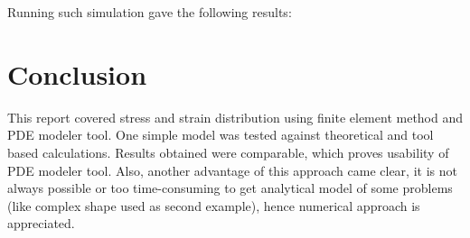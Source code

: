 \documentclass[onecolumn]{article}
\begin{document}
\newpage
Running such simulation gave the following results: \\
\noindent{}

\section{Conclusion}
This report covered stress and strain distribution using finite element method and PDE modeler tool. One simple model was tested against theoretical and tool based calculations. Results obtained were comparable, which proves usability of PDE modeler tool. Also, another advantage of this approach came clear, it is not always possible or too time-consuming to get analytical model of some problems (like complex shape used as second example), hence numerical approach is appreciated.
\end{document}
